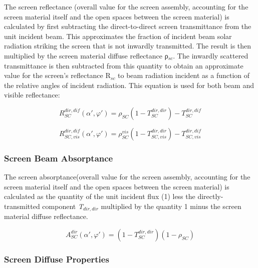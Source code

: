 The screen reflectance (overall value for the screen assembly, accounting for the screen material itself and the open spaces between the screen material) is calculated by first subtracting the direct-to-direct screen transmittance from the unit incident beam. This approximates the fraction of incident beam solar radiation striking the screen that is not inwardly transmitted. The result is then multiplied by the screen material diffuse reflectance ρ\(_{sc}\). The inwardly scattered transmittance is then subtracted from this quantity to obtain an approximate value for the screen's reflectance R\(_{sc}\) to beam radiation incident as a function of the relative angles of incident radiation. This equation is used for both beam and visible reflectance:

\begin{equation}
R_{SC}^{dir,dif}\left( {\alpha ',\varphi '} \right) = {\rho_{SC}}\left( {1 - T_{SC}^{dir,dir}} \right) - T_{SC}^{dir,dif}
\end{equation}

\begin{equation}
R_{SC,vis}^{dir,dif}\left( {\alpha ',\varphi '} \right) = \rho_{SC}^{vis}\left( {1 - T_{SC,vis}^{dir,dir}} \right) - T_{SC,vis}^{dir,dif}
\end{equation}

\subsubsection{Screen Beam Absorptance}\label{screen-beam-absorptance}

The screen absorptance(overall value for the screen assembly, accounting for the screen material itself and the open spaces between the screen material) is calculated as the quantity of the unit incident flux (1) less the directly-transmitted component \emph{T\(_{dir,dir}\)} multiplied by the quantity 1 minus the screen material diffuse reflectance.

\begin{equation}
A_{SC}^{dir}\left( {\alpha ',\varphi '} \right) = \left( {1 - T_{SC}^{dir,dir}} \right)\left( {1 - {\rho_{SC}}} \right)
\end{equation}

\subsubsection{Screen Diffuse Properties}\label{screen-diffuse-properties}

